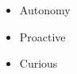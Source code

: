 %
%
%

\twocolumnsection
{
\begin{skills}
\end{skills}}
{
\vspace{1em}
\begin{itemize}
	\item Autonomy
    \item Proactive
    \item Curious
\end{itemize}
}
